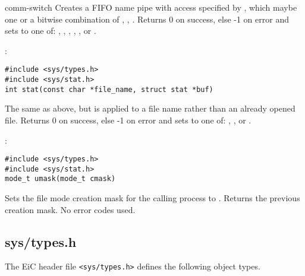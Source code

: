 \begin{Ventry2}{comm-switch  }
Creates a FIFO name pipe with access specified by ,
which maybe one or a bitwise combination of
, , . 
Returns 0 on success, else -1 on error and sets
 to one of: , , ,
, ,  or . 

\item[stat]
\label{item:stat}
:
\begin{production}
\begin{verbatim}
#include <sys/types.h> 
#include <sys/stat.h> 
int stat(const char *file_name, struct stat *buf)
\end{verbatim}
\end{production}

The same as  above, but is applied to a file name rather than
an already opened file. Returns 0 on success, else -1 on error and sets
 to one of: , 
,  or .


\item[umask]
\label{item:umask}
:
\begin{production}
\begin{verbatim}
#include <sys/types.h> 
#include <sys/stat.h> 
mode_t umask(mode_t cmask)
\end{verbatim}
\end{production}

Sets the file mode creation mask for the calling process to .
Returns the previous creation mask. No error codes used.

\end{Ventry2}


\subsection{sys/types.h}
\label{sec:systypesh}

The EiC header file \verb+<sys/types.h>+ defines the following object
types.


